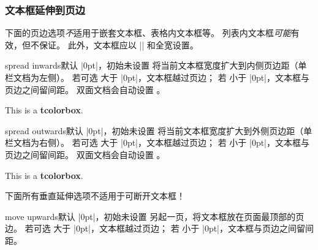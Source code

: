 \clearpage
\subsubsection{文本框延伸到页边}

\begin{marker}
下面的页边选项\emph{不}适用于嵌套文本框、表格内文本框等。
列表内文本框\emph{可能}有效，但不保证。
此外，文本框应以 |\noindent| 和全宽设置。
\end{marker}

\begin{docTcbKey}[][doc new=2017-02-13]{spread inwards}{}{默认 |0pt|，初始未设置}
将当前文本框宽度扩大到内侧页边距（单栏文档为左侧）。
若可选  大于 |0pt|，文本框越过页边；
若  小于 |0pt|，文本框与页边之间留间距。
双面文档会自动设置 。
\begin{dispListing}
\begin{tcolorbox}[enhanced,spread inwards,
  colframe=blue!75!black,colback=white,show bounding box]
This is a \textbf{tcolorbox}.
\end{tcolorbox}
\end{dispListing}
{\tcbusetemp}
\end{docTcbKey}

\begin{docTcbKey}[][doc new=2017-02-13]{spread outwards}{}{默认 |0pt|，初始未设置}
将当前文本框宽度扩大到外侧页边距（单栏文档为右侧）。
若可选  大于 |0pt|，文本框越过页边；
若  小于 |0pt|，文本框与页边之间留间距。
双面文档会自动设置 。
\begin{dispListing}
\begin{tcolorbox}[enhanced,spread outwards,
  colframe=blue!75!black,colback=white,show bounding box]
This is a \textbf{tcolorbox}.
\end{tcolorbox}
\end{dispListing}
{\tcbusetemp}
\end{docTcbKey}

\begin{marker}
下面所有垂直延伸选项不适用于可断开文本框！
\end{marker}

\begin{docTcbKey}[][doc new=2017-02-13]{move upwards}{}{默认 |0pt|，初始未设置}
  另起一页，将文本框放在页面最顶部的页边。
  若可选  大于 |0pt|，文本框越过页边；
  若  小于 |0pt|，文本框与页边之间留间距。
\end{docTcbKey}


